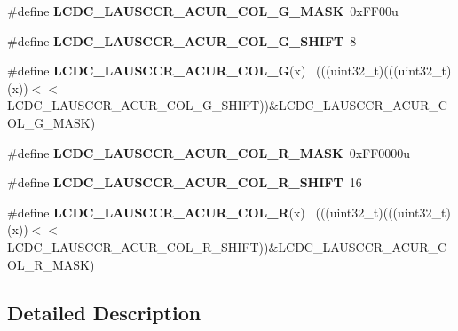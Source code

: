 \begin{DoxyCompactItemize}
\item 
\hypertarget{group___l_c_d_c___register___masks_gaa7c1d97b5f2be3d6c4608f947849bb7b}{}\#define {\bfseries L\+C\+D\+C\+\_\+\+L\+A\+U\+S\+C\+C\+R\+\_\+\+A\+C\+U\+R\+\_\+\+C\+O\+L\+\_\+\+G\+\_\+\+M\+A\+S\+K}~0x\+F\+F00u\label{group___l_c_d_c___register___masks_gaa7c1d97b5f2be3d6c4608f947849bb7b}

\item 
\hypertarget{group___l_c_d_c___register___masks_ga3f97867b672d41c992e25297cefb2612}{}\#define {\bfseries L\+C\+D\+C\+\_\+\+L\+A\+U\+S\+C\+C\+R\+\_\+\+A\+C\+U\+R\+\_\+\+C\+O\+L\+\_\+\+G\+\_\+\+S\+H\+I\+F\+T}~8\label{group___l_c_d_c___register___masks_ga3f97867b672d41c992e25297cefb2612}

\item 
\hypertarget{group___l_c_d_c___register___masks_gaa94263c051ab34d8e39514dc6d81e312}{}\#define {\bfseries L\+C\+D\+C\+\_\+\+L\+A\+U\+S\+C\+C\+R\+\_\+\+A\+C\+U\+R\+\_\+\+C\+O\+L\+\_\+\+G}(x)                          ~(((uint32\+\_\+t)(((uint32\+\_\+t)(x))$<$$<$L\+C\+D\+C\+\_\+\+L\+A\+U\+S\+C\+C\+R\+\_\+\+A\+C\+U\+R\+\_\+\+C\+O\+L\+\_\+\+G\+\_\+\+S\+H\+I\+F\+T))\&L\+C\+D\+C\+\_\+\+L\+A\+U\+S\+C\+C\+R\+\_\+\+A\+C\+U\+R\+\_\+\+C\+O\+L\+\_\+\+G\+\_\+\+M\+A\+S\+K)\label{group___l_c_d_c___register___masks_gaa94263c051ab34d8e39514dc6d81e312}

\item 
\hypertarget{group___l_c_d_c___register___masks_gaef5f74728fe5f2ef68fe622fbeacaca8}{}\#define {\bfseries L\+C\+D\+C\+\_\+\+L\+A\+U\+S\+C\+C\+R\+\_\+\+A\+C\+U\+R\+\_\+\+C\+O\+L\+\_\+\+R\+\_\+\+M\+A\+S\+K}~0x\+F\+F0000u\label{group___l_c_d_c___register___masks_gaef5f74728fe5f2ef68fe622fbeacaca8}

\item 
\hypertarget{group___l_c_d_c___register___masks_ga51ad78c70678dc7944c190af39c63de1}{}\#define {\bfseries L\+C\+D\+C\+\_\+\+L\+A\+U\+S\+C\+C\+R\+\_\+\+A\+C\+U\+R\+\_\+\+C\+O\+L\+\_\+\+R\+\_\+\+S\+H\+I\+F\+T}~16\label{group___l_c_d_c___register___masks_ga51ad78c70678dc7944c190af39c63de1}

\item 
\hypertarget{group___l_c_d_c___register___masks_gadab53d4786f36d05966ca75623ccb1f5}{}\#define {\bfseries L\+C\+D\+C\+\_\+\+L\+A\+U\+S\+C\+C\+R\+\_\+\+A\+C\+U\+R\+\_\+\+C\+O\+L\+\_\+\+R}(x)                          ~(((uint32\+\_\+t)(((uint32\+\_\+t)(x))$<$$<$L\+C\+D\+C\+\_\+\+L\+A\+U\+S\+C\+C\+R\+\_\+\+A\+C\+U\+R\+\_\+\+C\+O\+L\+\_\+\+R\+\_\+\+S\+H\+I\+F\+T))\&L\+C\+D\+C\+\_\+\+L\+A\+U\+S\+C\+C\+R\+\_\+\+A\+C\+U\+R\+\_\+\+C\+O\+L\+\_\+\+R\+\_\+\+M\+A\+S\+K)\label{group___l_c_d_c___register___masks_gadab53d4786f36d05966ca75623ccb1f5}

\end{DoxyCompactItemize}


\subsection{Detailed Description}
